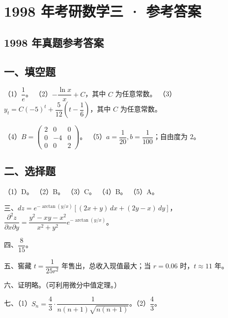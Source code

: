 \documentclass[UTF8,12pt]{ctexart}
\begin{document}
\section*{1998 年考研数学三 · 参考答案}
\subsection*{1998 年真题参考答案}

\subsection*{一、填空题}

（1）\(\displaystyle \dfrac{\displaystyle 1}{\displaystyle e}\)。 （2）\(\displaystyle -\dfrac{\displaystyle \ln x}{\displaystyle x}+C\)，其中 \(\displaystyle C\) 为任意常数。 （3）\(\displaystyle y_t=C(-5)^t+\dfrac{\displaystyle 5}{\displaystyle 12}\left(t-\dfrac{\displaystyle 1}{\displaystyle 6}\right)\)，其中 \(\displaystyle C\) 为任意常数。


（4）\(\displaystyle B=\begin{pmatrix}2&0&0\\0&-4&0\\0&0&2\end{pmatrix}\)。 （5）\(\displaystyle a=\dfrac{\displaystyle 1}{\displaystyle 20},\allowbreak b=\dfrac{\displaystyle 1}{\displaystyle 100}\)；自由度为 \(\displaystyle 2\)。


\subsection*{二、选择题}

（1）D。 （2）B。 （3）C。 （4）B。 （5）A。


三、\(\displaystyle dz=e^{-\arctan(y/x)}[(2x+y)\,dx+(2y-x)\,dy]\)，\(\displaystyle \dfrac{\displaystyle \partial^2z}{\displaystyle \partial x\partial y}=\dfrac{\displaystyle y^2-xy-x^2}{\displaystyle x^2+y^2}e^{-\arctan(y/x)}\)。


四、\(\displaystyle \dfrac{\displaystyle 8}{\displaystyle 15}\)。


五、窖藏 \(\displaystyle t=\dfrac{\displaystyle 1}{\displaystyle 25r^2}\) 年售出，总收入现值最大；当 \(\displaystyle r=0.06\) 时，\(\displaystyle t\approx11\) 年。


六、证明略。（可利用微分中值定理。）


七、（1）\(\displaystyle S_n=\dfrac{\displaystyle 4}{\displaystyle 3}\cdot\dfrac{\displaystyle 1}{\displaystyle n(n+1)\sqrt{n(n+1)}}\)。（2）\(\displaystyle \dfrac{\displaystyle 4}{\displaystyle 3}\)。
\end{document}
